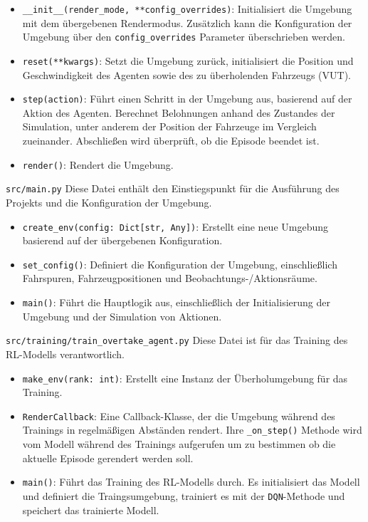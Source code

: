 \begin{itemize}
    \item \texttt{\_\_init\_\_(render\_mode, **config\_overrides)}: Initialisiert die Umgebung mit dem übergebenen Rendermodus. Zusätzlich kann die Konfiguration der Umgebung über den \texttt{config\_overrides} Parameter überschrieben werden.
    \item \texttt{reset(**kwargs)}: Setzt die Umgebung zurück, initialisiert die Position und Geschwindigkeit des Agenten sowie des zu überholenden Fahrzeugs (VUT).
    \item \texttt{step(action)}: Führt einen Schritt in der Umgebung aus, basierend auf der Aktion des Agenten. Berechnet Belohnungen anhand des Zustandes der Simulation, unter anderem der Position der Fahrzeuge im Vergleich zueinander. Abschließen wird überprüft, ob die Episode beendet ist. 
    \item \texttt{render()}: Rendert die Umgebung.
\end{itemize}

\texttt{src/main.py}
Diese Datei enthält den Einstiegspunkt für die Ausführung des Projekts und die Konfiguration der Umgebung.

\begin{itemize}
    \item \texttt{create\_env(config: Dict[str, Any])}: Erstellt eine neue Umgebung basierend auf der übergebenen Konfiguration.
    \item \texttt{set\_config()}: Definiert die Konfiguration der Umgebung, einschließlich Fahrspuren, Fahrzeugpositionen und Beobachtungs-/Aktionsräume.
    \item \texttt{main()}: Führt die Hauptlogik aus, einschließlich der Initialisierung der Umgebung und der Simulation von Aktionen.
\end{itemize}

\texttt{src/training/train\_overtake\_agent.py}
Diese Datei ist für das Training des RL-Modells verantwortlich.

\begin{itemize}
    \item \texttt{make\_env(rank: int)}: Erstellt eine Instanz der Überholumgebung für das Training.
    \item \texttt{RenderCallback}: Eine Callback-Klasse, der die Umgebung während des Trainings in regelmäßigen Abständen rendert. Ihre \texttt{\_on\_step()} Methode wird vom Modell während des Trainings aufgerufen um zu bestimmen ob die aktuelle Episode gerendert werden soll.
    \item \texttt{main()}: Führt das Training des RL-Modells durch. Es initialisiert das Modell und definiert die Traingsumgebung, trainiert es mit der \texttt{DQN}-Methode und speichert das trainierte Modell.
\end{itemize}

